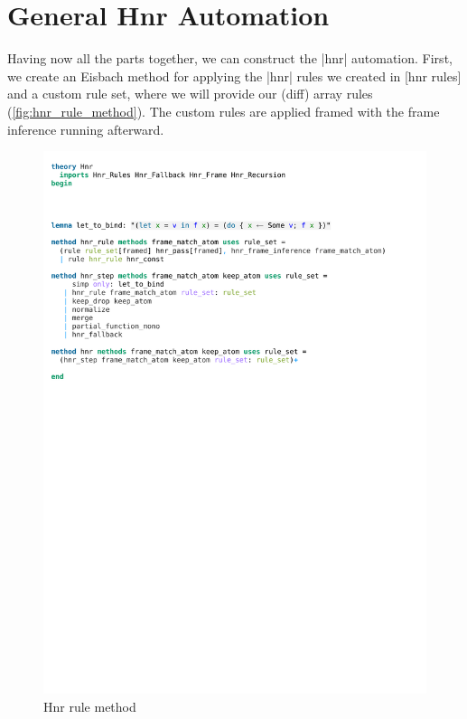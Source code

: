 \section{General Hnr Automation}\label{section:general_hnr}

Having now all the parts together, we can construct the |hnr| automation. First, we create an Eisbach method for applying the |hnr| rules we created in [hnr rules] and a custom rule set, where we will provide our (diff) array rules (\autoref{fig:hnr_rule_method}). The custom rules are applied framed with the frame inference running afterward.

\begin{figure}[htpb]
    \includegraphics[trim={0 23,6cm 0 4,8cm}, clip, width=1.00\textwidth]{figures/Theory_Hnr.pdf}
    \caption[Hnr rule method]{Hnr rule method}
    \label{fig:hnr_rule_method}
\end{figure}

